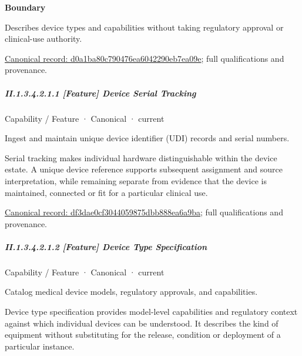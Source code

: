 \textbf{Boundary}



Describes device types and capabilities without taking regulatory approval or clinical-use authority.


{\footnotesize \href{../../../../continuum/strategy/capability/d0a1ba80c790476ea6042290eb7ea09e.md}{Canonical record: d0a1ba80c790476ea6042290eb7ea09e}; full qualifications and provenance.}\par
\subparagraph*{II.1.3.4.2.1.1 [Feature] Device Serial Tracking}
\label{navigation:II.1.3.4.2.1.1}

\label{element:df3dae0cf3044059875dbb888ea6a9ba}
{\small Capability / Feature · Canonical · current}\par

Ingest and maintain unique device identifier (UDI) records and serial numbers.



Serial tracking makes individual hardware distinguishable within the device estate. A unique device reference supports subsequent assignment and source interpretation, while remaining separate from evidence that the device is maintained, connected or fit for a particular clinical use.


{\footnotesize \href{../../../../continuum/strategy/capability/feature/df3dae0cf3044059875dbb888ea6a9ba.md}{Canonical record: df3dae0cf3044059875dbb888ea6a9ba}; full qualifications and provenance.}\par
\subparagraph*{II.1.3.4.2.1.2 [Feature] Device Type Specification}
\label{navigation:II.1.3.4.2.1.2}

\label{element:ca6d91b03b56415790810846649a3dca}
{\small Capability / Feature · Canonical · current}\par

Catalog medical device models, regulatory approvals, and capabilities.



Device type specification provides model-level capabilities and regulatory context against which individual devices can be understood. It describes the kind of equipment without substituting for the release, condition or deployment of a particular instance.


